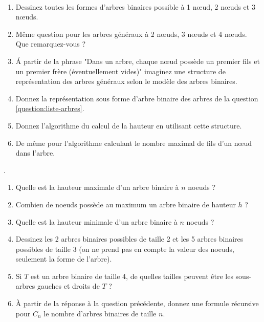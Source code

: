 \documentclass{../cours}
\begin{document}
\begin{exercice}

~
\begin{enumerate}
\item Dessinez toutes les formes d'arbres binaires possible à 1 nœud, 2 nœuds et 3 nœuds.
\item Même question pour les arbres généraux à 2 nœuds, 3 nœuds et 4 nœuds. Que remarquez-vous ?
\label{question:liste-arbres}
\item \'A partir de la phrase "Dans un arbre, chaque nœud possède un premier fils et un premier frère (éventuellement vides)" imaginez une structure de représentation des arbres généraux selon le modèle des arbres binaires.
\item Donnez la représentation sous forme d'arbre binaire des arbres de la question \ref{question:liste-arbres}.
\item Donnez l'algorithme du calcul de la hauteur en utilisant cette structure. 
\item De même pour l'algorithme calculant le nombre maximal de fils d'un nœud dans l'arbre.
\end{enumerate}
\end{exercice}

\begin{exercice} .

\begin{enumerate}
\item Quelle est la hauteur maximale d'un arbre binaire à $n$ noeuds ?

\item Combien de noeuds possède au maximum un arbre binaire de hauteur $h$ ?

\item Quelle est la hauteur minimale d'un arbre binaire à $n$ noeuds ? 

\item Dessinez les 2 arbres binaires possibles de taille 2 et les 5 arbres binaires possibles de taille 3 (on ne prend pas en compte la valeur des noeuds, seulement la forme de l'arbre).

\item Si $T$ est un arbre binaire de taille 4, de quelles tailles peuvent être les sous-arbres gauches et droits de $T$ ?

\item À partir de la réponse à la question précédente, donnez une formule récursive pour $C_n$ le nombre d'arbres binaires de taille $n$.
\end{enumerate}

\end{exercice}
\end{document}
